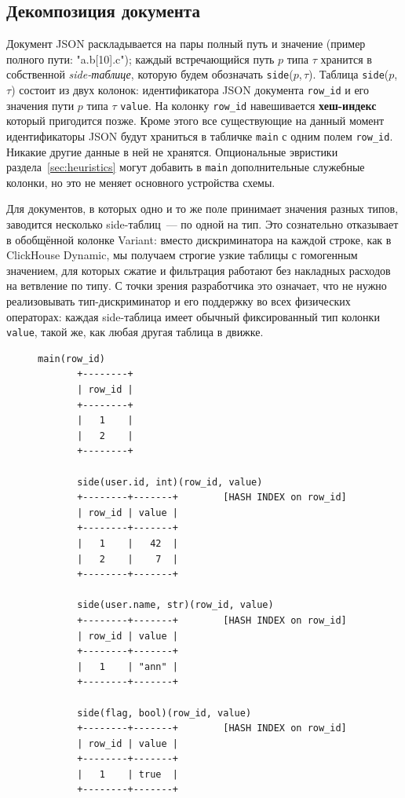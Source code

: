 \documentclass[conference,a4paper,10pt]{IEEEtran}
\begin{document}
\subsection{Декомпозиция документа}

Документ JSON раскладывается на пары полный путь и значение (пример полного пути: "a.b[10].c");
каждый встречающийся путь $p$ типа $\tau$ хранится в собственной
\emph{side-таблице}, которую будем обозначать
\texttt{side}($p$,\,$\tau$). Таблица \texttt{side}($p$,\,$\tau$)
состоит из двух колонок: идентификатора JSON документа \texttt{row\_id} и его значения пути $p$ типа $\tau$ \texttt{value}.
На колонку \texttt{row\_id}
навешивается \textbf{хеш-индекс} который пригодится позже.
Кроме этого все существующие на данный момент идентификаторы JSON будут храниться в табличке \texttt{main} с одним полем \texttt{row\_id}.
Никакие другие данные в ней не хранятся. Опциональные эвристики раздела~\ref{sec:heuristics}
могут добавить в \texttt{main} дополнительные служебные колонки,
но это не меняет основного устройства схемы.

Для документов, в которых одно и то же поле принимает значения
разных типов, заводится несколько side-таблиц~--- по одной на тип.
Это сознательно отказывает в обобщённой колонке Variant: вместо
дискриминатора на каждой строке, как в ClickHouse Dynamic, мы
получаем строгие узкие таблицы с гомогенным значением, для которых
сжатие и фильтрация работают без накладных расходов на ветвление по
типу. С точки зрения разработчика это означает, что не нужно
реализовывать тип-дискриминатор и его поддержку во всех физических
операторах: каждая side-таблица имеет обычный фиксированный тип
колонки \texttt{value}, такой же, как любая другая таблица в
движке.

\begin{figure}[h]
\centering
\begin{lstlisting}[caption={Логический разрез данных. Документы
$\{$user.id=42, user.name="ann", flag=true$\}$ и
$\{$user.id=7, level=3$\}$.},label={fig:layout}]
       main(row_id)
       +--------+
       | row_id |
       +--------+
       |   1    |
       |   2    |
       +--------+

       side(user.id, int)(row_id, value)
       +--------+-------+        [HASH INDEX on row_id]
       | row_id | value |
       +--------+-------+
       |   1    |   42  |
       |   2    |    7  |
       +--------+-------+

       side(user.name, str)(row_id, value)
       +--------+-------+        [HASH INDEX on row_id]
       | row_id | value |
       +--------+-------+
       |   1    | "ann" |
       +--------+-------+

       side(flag, bool)(row_id, value)
       +--------+-------+        [HASH INDEX on row_id]
       | row_id | value |
       +--------+-------+
       |   1    | true  |
       +--------+-------+
\end{lstlisting}
\end{figure}
\end{document}
